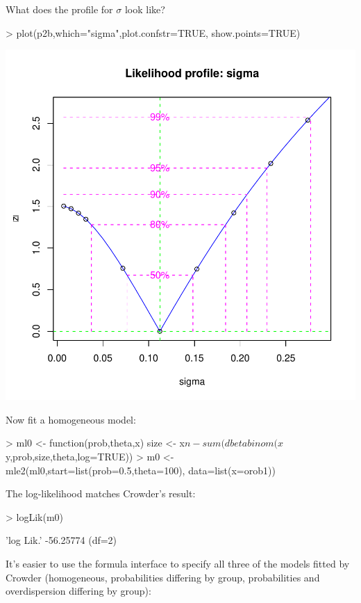 \documentclass{article}
\begin{document}
What does the profile for $\sigma$ look like?
\begin{Schunk}
\begin{Sinput}
> plot(p2b,which="sigma",plot.confstr=TRUE,
      show.points=TRUE)
\end{Sinput}
\end{Schunk}
\includegraphics{mle2-026}

Now fit a homogeneous model:
\begin{Schunk}
\begin{Sinput}
> ml0 <- function(prob,theta,x) {
   size <- x$n
   -sum(dbetabinom(x$y,prob,size,theta,log=TRUE))
 }
> m0 <- mle2(ml0,start=list(prob=0.5,theta=100),
           data=list(x=orob1))
\end{Sinput}
\end{Schunk}

The log-likelihood matches Crowder's result:
\begin{Schunk}
\begin{Sinput}
> logLik(m0)
\end{Sinput}
\begin{Soutput}
'log Lik.' -56.25774 (df=2)
\end{Soutput}
\end{Schunk}

It's easier to 
use the formula interface
to specify all three of the models
fitted by Crowder (homogeneous, probabilities differing
by group, probabilities and overdispersion differing
by group):
\end{document}
